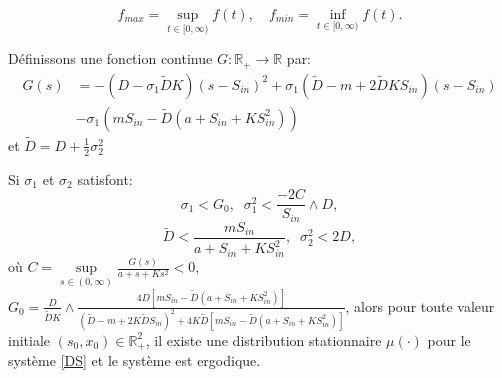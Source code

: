\documentclass[12pt,a4paper]{report}%
\begin{document}
\[f_{max} = \sup_{t \in [0, \infty)} f(t), \quad f_{min} = \inf_{t \in [0, \infty)} f(t).\]

Définissons une fonction continue \(G : \mathbb{R}_+ \to \mathbb{R}\) par:
$$
\begin{aligned}
	G(s)&=-(D-\sigma_1 \tilde{D} K )(s-S_{in})^2 +\sigma_1(\tilde{D}-m+2\tilde{D} K S_{in})(s-S_{in})\\
	&-\sigma_1(mS_{in}-\tilde{D}(a+S_{in}+KS_{in}^2))
\end{aligned}
$$
et $\tilde{D} = D + \frac{1}{2} \sigma_2^2$
\begin{théorème}{}{}
	Si $\sigma_1$ et $\sigma_2$ satisfont:
	\begin{equation}\label{1}
		\sigma_1 < G_0, \;\; \sigma_1^2 < \frac{-2C}{S_{in}} \wedge D,
	\end{equation}
	\begin{equation}\label{2}
		\tilde{D} <\frac{mS_{in}}{a+S_{in}+KS_{in}^2}, \;\; \sigma_2^2 < 2D,
	\end{equation}
	où \(C = \sup\limits_{s \in (0, \infty)} \frac{G(s)}{a + s +Ks^2}< 0\),  $G_0=\frac{D}{\tilde{D} K} \wedge \frac{4D[mS_{in}-\tilde{D}(a+S_{in}+KS_{in}^2)]}{(\tilde{D}-m+2K\tilde{D}S_{in})^2+4K\tilde{D}[mS_{in}-\tilde{D}(a+S_{in}+KS_{in}^2)]}$, alors pour toute valeur initiale \((s_0, x_0) \in \mathbb{R}_+^2\), il existe une distribution stationnaire \(\mu(\cdot)\) pour le système \eqref{DS} et le système est ergodique.
\end{théorème}
\end{document}
